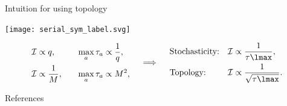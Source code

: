 \documentclass[final]{beamer}%
\newcommand{\initial}{\mathcal{I}}
\begin{document}

\begin{frame}{Intuition for using topology}
%
 \begin{center}
   \texttt{[image: serial\_sym\_label.svg]}
 \end{center}
%
%
\begin{equation*}
  \begin{aligned}
    \initial &\propto q,
    &\quad
    \max_a \tau_a &\propto \frac{1}{q}, \\
    \initial &\propto \frac{1}{M},
    &
    \max_a \tau_a &\propto M^2, \\
  \end{aligned}
  \quad\implies\quad
  \begin{aligned}
    &\text{Stochasticity:} & \initial &\propto \frac{1}{\tau\lmax}, \\
    &\text{Topology:}      & \initial &\propto \frac{1}{\sqrt{\tau\lmax}}.
  \end{aligned}
\end{equation*}
%

%
\end{frame}

\begin{frame}[allowframebreaks]{References}
%

 {\small
 
 
 }
%
\end{frame}


\end{document}
